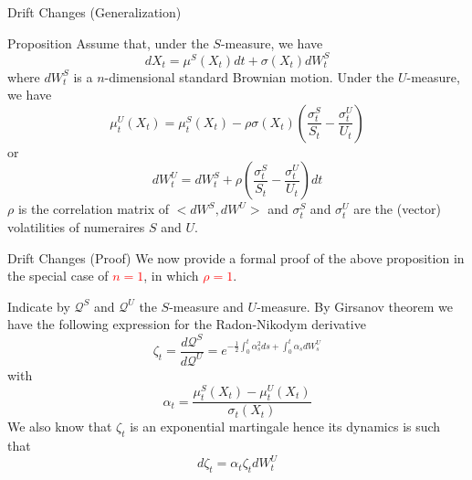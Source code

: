 \documentclass{beamer}
\begin{document}
\begin{frame}{Drift Changes (Generalization)}
	\begin{block}{Proposition}
	Assume that, under the $S$-measure, we have
	\begin{equation*}
	dX_t = \mu^S(X_t)dt + \sigma(X_t)dW^S_t
	\end{equation*}
	where $dW^S_t$ is a $n$-dimensional standard Brownian motion. Under the $U$-measure, we have
	\begin{equation}
	\mu^U_t(X_t) = \mu^S_t(X_t) - \rho\sigma(X_t)\left(\frac{\sigma^S_t}{S_t}-\frac{\sigma^U_t}{U_t}\right)
	\end{equation}
	or
	\begin{equation}
	dW^U_t = dW^S_t + \rho\left(\frac{\sigma^S_t}{S_t}-\frac{\sigma^U_t}{U_t}\right) dt
	\end{equation}
	$\rho$ is the correlation matrix of $<dW^S,dW^U>$ and $\sigma^S_t$ and $\sigma^U_t$ are the (vector) volatilities of numeraires $S$ and $U$. %
	\end{block}
\end{frame}

\begin{frame}{Drift Changes (Proof)}
	We now provide a formal proof of the above proposition in the special case of \textcolor{red}{$n=1$}, in which \textcolor{red}{$\rho=1$}.
	
	Indicate by $\mathcal{Q}^S$ and $\mathcal{Q}^U$ the $S$-measure and $U$-measure. By Girsanov theorem we have the following expression for the Radon-Nikodym derivative
	\begin{equation*}
	\zeta_t = \frac{d\mathcal{Q}^S}{d\mathcal{Q}^U} = e^{-\frac{1}{2}\int_0^t\alpha_s^2 ds + \int_0^t\alpha_s dW_s^U}
	\end{equation*}
	with 
	\begin{equation}
	\alpha_t=\frac{\mu^S_t(X_t)-\mu_t^U(X_t)}{\sigma_t(X_t)}
    \label{eq:alpha_t}
	\end{equation}
	We also know that $\zeta_t$ is an exponential martingale hence its dynamics is such that 
	\begin{equation}
	d\zeta_t=\alpha_t\zeta_tdW_t^U
	\label{eq:dzeta1}
	\end{equation}
\end{frame}
\end{document}
